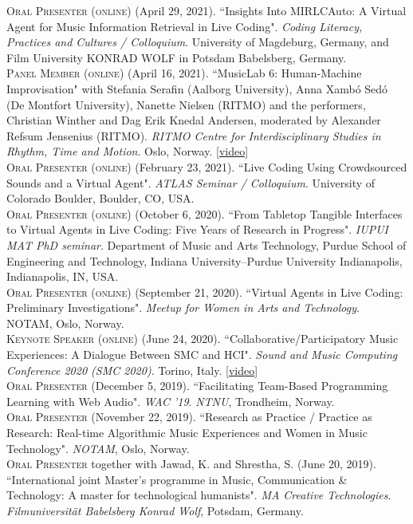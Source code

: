\documentclass[10pt, a4paper]{article}
\newcommand{\years}[1]{\marginnote{\scriptsize #1}}
\begin{document}
{\years{2021c} \textsc{Oral Presenter (online)} (April 29, 2021). “Insights Into MIRLCAuto: A Virtual Agent for Music Information Retrieval in Live Coding". \emph{Coding Literacy, Practices and Cultures / Colloquium}. University of Magdeburg, Germany, and Film University KONRAD WOLF in Potsdam Babelsberg, Germany.\\ 
\years{2021b} \textsc{Panel Member (online)} (April 16, 2021). “MusicLab 6: Human-Machine Improvisation" with Stefania Serafin (Aalborg University), Anna Xambó Sedó (De Montfort University), Nanette Nielsen (RITMO) and the performers, Christian Winther and Dag Erik Knedal Andersen, moderated by Alexander Refsum Jensenius (RITMO). \emph{RITMO Centre for Interdisciplinary Studies in Rhythm, Time and Motion}. Oslo, Norway. \href{https://youtu.be/yeIRxkm-kSc}{[video]}\\ 
\years{2021a} \textsc{Oral Presenter (online)} (February 23, 2021). “Live Coding Using Crowdsourced Sounds and a Virtual Agent". \emph{ATLAS Seminar / Colloquium}. University of Colorado Boulder, Boulder, CO, USA.\\ 
\years{2020c} \textsc{Oral Presenter (online)} (October 6, 2020). “From Tabletop Tangible Interfaces to Virtual Agents in Live Coding: Five Years of Research in Progress". \emph{IUPUI MAT PhD seminar}. Department of Music and Arts Technology, Purdue School of Engineering and Technology, Indiana University--Purdue University Indianapolis, Indianapolis, IN, USA.\\ 
\years{2020b} \textsc{Oral Presenter (online)} (September 21, 2020). “Virtual Agents in Live Coding: Preliminary Investigations". \emph{Meetup for Women in Arts and Technology}. NOTAM, Oslo, Norway.\\ 
\years{2020a} \textsc{Keynote Speaker (online)} (June 24, 2020). “Collaborative/Participatory Music Experiences: A Dialogue Between SMC and HCI". \emph{Sound and Music Computing Conference 2020 (SMC 2020)}. Torino, Italy. \href{https://youtu.be/fWqhhdkVO6o}{[video]}\\ 
\years{2019d} \textsc{Oral Presenter} (December 5, 2019). “Facilitating Team-Based Programming Learning with Web Audio". \emph{WAC '19}. 
\emph{NTNU}, Trondheim, Norway.\\
\years{2019c} \textsc{Oral Presenter} (November 22, 2019). “Research as Practice / Practice as Research: Real-time Algorithmic Music Experiences and Women in Music Technology". \emph{NOTAM}, Oslo, Norway.\\
\years{2019b} \textsc{Oral Presenter} together with Jawad, K. and Shrestha, S. (June 20, 2019). “International joint Master's programme in Music, Communication \& Technology: A master for technological humanists". \emph{MA Creative Technologies}. \emph{Filmuniversität  Babelsberg Konrad Wolf}, Potsdam, Germany.\\
}
\end{document}
